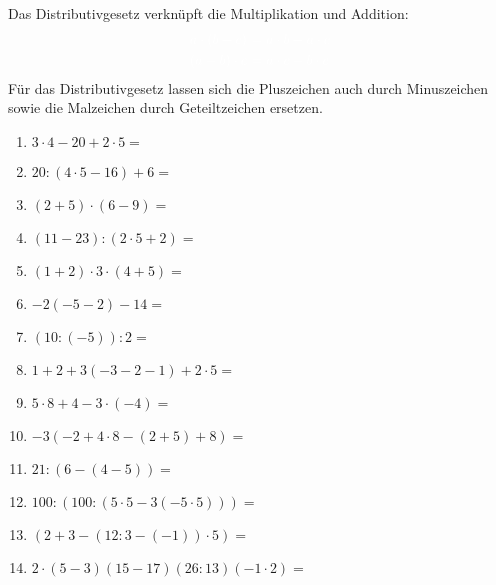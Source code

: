 Das Distributivgesetz verknüpft die Multiplikation und Addition:
\begin{align*}
	\textcolor{loes}{a\cdot\left( b+c\right)\ }&\textcolor{loes}{=a\cdot b+a\cdot c}\\
	\textcolor{loes}{\left( a+b\right) \cdot c\ }&\textcolor{loes}{=a\cdot c+b\cdot c }
\end{align*}
Für das Distributivgesetz lassen sich die Pluszeichen auch durch Minuszeichen sowie die Malzeichen durch Geteiltzeichen ersetzen.
\newpage
\begin{Exercise}[title={Berechne die folgenden Ausdrücke}, label=einfachesRechnenA1]
	
	\begin{minipage}{\textwidth}
		\begin{minipage}{0.49\textwidth}
			\begin{enumerate}[label=\alph*)]
				\item \(3\cdot 4-20+2\cdot 5=\)
				\item \(20:\left( 4\cdot 5-16\right) +6=\)
				\item \(\left( 2+5\right) \cdot \left( 6-9\right) =\)
				\item \(\left( 11-23\right) :\left( 2\cdot 5+2\right) =\)
				\item \(\left( 1+2\right) \cdot3\cdot\left( 4+5\right) =\)
				\item \(-2\left( -5-2\right) -14=\)
				\item \(\left( 10:\left( -5\right)\right)  :2=\)
				\item \(1+2+3\left( -3-2-1\right) +2\cdot 5=\)
				\item \(5\cdot 8+4-3\cdot \left( -4\right) =\)
				\item \(-3\left( -2+4\cdot 8-\left( 2+5\right) +8\right) =\)
				\item \(21:\left( 6-\left( 4-5\right) \right) =\)
				\item \(100:\left( 100:\left( 5\cdot 5-3\left( -5\cdot 5\right) \right) \right) =\)
				\item \(\left( 2+3-\left( 12:3-\left( -1\right) \right)\cdot 5 \right) =\)
			\end{enumerate}
		\end{minipage}
		\begin{minipage}{0.49\textwidth}
			\begin{enumerate}[label=\alph*)]
				\setcounter{enumi}{13}
				\item \(2\cdot\left(5-3\right) \left( 15-17\right) \left( 26:13\right) \left( -1\cdot 2\right) = \)

\end{enumerate}
\end{minipage}
\end{minipage}
\end{Exercise}
